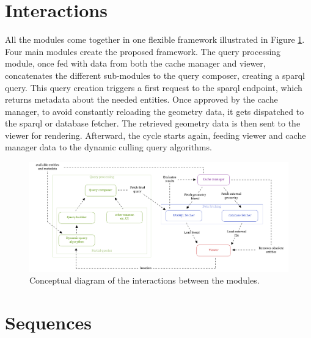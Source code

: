 \section{Interactions} \label{sec:interactions}

All the modules come together in one flexible framework illustrated in Figure \ref{fig:interactionModules}. Four main modules create the proposed framework. The query processing module, once fed with data from both the cache manager and viewer, concatenates the different sub-modules to the query composer, creating a \ac{sparql} query. This query creation triggers a first request to the \ac{sparql} endpoint, which returns metadata about the needed entities. Once approved by the cache manager, to avoid constantly reloading the geometry data, it gets dispatched to the \ac{sparql} or database fetcher. The retrieved geometry data is then sent to the viewer for rendering. Afterward, the cycle starts again, feeding viewer and cache manager data to the dynamic culling query algorithms.

\begin{figure}[H]
  \centering
  \includegraphics[width=\textwidth]{figures/pdf/interactions_concept.pdf}
  \caption[Interactions modular framework]{Conceptual diagram of the interactions between the modules.}
  \label{fig:interactionModules}
\end{figure}

\section{Sequences}
